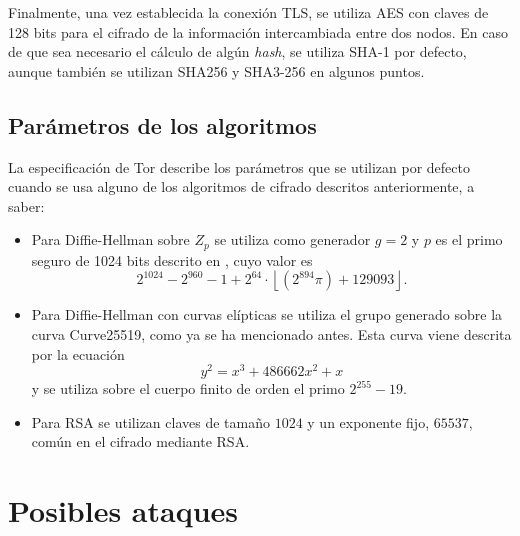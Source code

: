 \documentclass[
  a4paper,
  12pt,
  spanish,
]{scrartcl}
\begin{document}
Finalmente, una vez establecida la conexión TLS, se utiliza AES con claves de 128 bits para el cifrado de la información intercambiada entre dos nodos. En caso de que sea necesario el cálculo de algún \textit{hash}, se utiliza SHA-1 por defecto, aunque también se utilizan SHA256 y SHA3-256 en algunos puntos.

\subsection{Parámetros de los algoritmos}

La especificación de Tor describe los parámetros que se utilizan por defecto cuando se usa alguno de los algoritmos de cifrado descritos anteriormente, a saber: \begin{itemize}
  \item Para Diffie-Hellman sobre \(Z_p\) se utiliza como generador \(g=2\) y \(p\) es el primo seguro de 1024 bits descrito en \parencite{carrel_internet_1998}, cuyo valor es \[
    2^{1024} - 2^{960} - 1 + 2^{64} \cdot \left\lfloor (2^{894} \pi) + 129093 \right\rfloor.
  \]
  \item Para Diffie-Hellman con curvas elípticas se utiliza el grupo generado sobre la curva Curve25519, como ya se ha mencionado antes. Esta curva viene descrita por la ecuación \[
    y^{2}=x^{3}+486662x^{2}+x
  \]
  y se utiliza sobre el cuerpo finito de orden el primo \(2^{255}-19\).
  \item Para RSA se utilizan claves de tamaño \(1024\) y un exponente fijo, \(65537\), común en el cifrado mediante RSA.
\end{itemize}

\section{Posibles ataques}
\label{sec:ataques}
\end{document}
